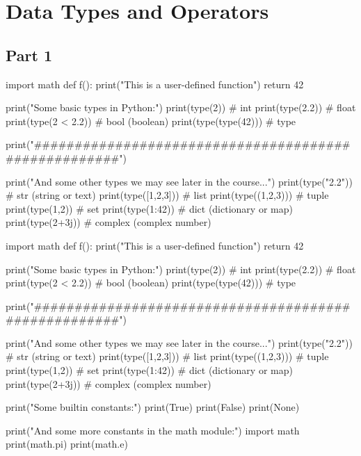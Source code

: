 \chapter{Data Types and Operators}

\section{Part 1}

\begin{runpython}[title=Some Builtin Types]
import math
def f():
    print("This is a user-defined function")
    return 42

print("Some basic types in Python:")
print(type(2))           # int
print(type(2.2))         # float
print(type(2 < 2.2))     # bool (boolean)
print(type(type(42)))    # type

print("#####################################################")

print("And some other types we may see later in the course...")
print(type("2.2"))       # str (string or text)
print(type([1,2,3]))     # list
print(type((1,2,3)))     # tuple
print(type({1,2}))       # set
print(type({1:42}))      # dict (dictionary or map)
print(type(2+3j))        # complex  (complex number)
\end{runpython}


\begin{runpython}[title=Some Builtin Types]
import math
def f():
    print("This is a user-defined function")
    return 42

print("Some basic types in Python:")
print(type(2))           # int
print(type(2.2))         # float
print(type(2 < 2.2))     # bool (boolean)
print(type(type(42)))    # type

print("#####################################################")

print("And some other types we may see later in the course...")
print(type("2.2"))       # str (string or text)
print(type([1,2,3]))     # list
print(type((1,2,3)))     # tuple
print(type({1,2}))       # set
print(type({1:42}))      # dict (dictionary or map)
print(type(2+3j))        # complex  (complex number)
\end{runpython}

\begin{runpython}[title=Some Builtin Constants]  
print("Some builtin constants:")
print(True)
print(False)
print(None)

print("And some more constants in the math module:")
import math
print(math.pi)
print(math.e)
\end{runpython}

